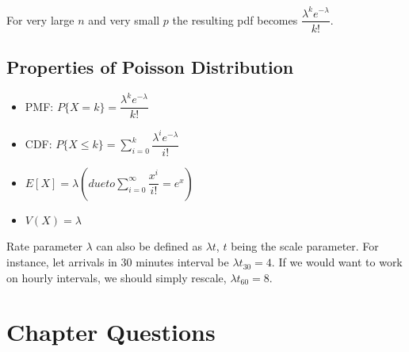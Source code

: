 \documentclass[]{book}
\theoremstyle{definition}
\theoremstyle{definition}
\theoremstyle{definition}
\theoremstyle{remark}
\begin{document}
For very large \(n\) and very small \(p\) the resulting pdf becomes
\(\dfrac{\lambda^k e^{-\lambda}}{k!}\).

\hypertarget{properties-of-poisson-distribution}{%
\subsection{Properties of Poisson
Distribution}\label{properties-of-poisson-distribution}}

\begin{itemize}
\item
  PMF: \(P\{X = k\} = \dfrac{\lambda^k e^{-\lambda}}{k!}\)
\item
  CDF:
  \(P\{X \le k\} = \sum_{i=0}^k \dfrac{\lambda^i e^{-\lambda}}{i!}\)
\item
  \(E[X] = \lambda (due to \sum_{i=0}^\infty\dfrac{x^i}{i!} = e^x)\)
\item
  \(V(X) = \lambda\)
\end{itemize}

Rate parameter \(\lambda\) can also be defined as \(\lambda t\), \(t\)
being the scale parameter. For instance, let arrivals in 30 minutes
interval be \(\lambda t_{30} = 4\). If we would want to work on hourly
intervals, we should simply rescale, \(\lambda t_{60} = 8\).

\hypertarget{chapter-questions}{%
\section{Chapter Questions}\label{chapter-questions}}
\end{document}

